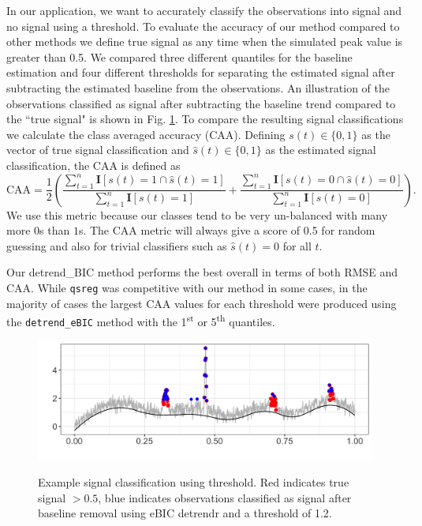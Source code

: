 \documentclass[12pt]{article}
\begin{document}
	In our application, we want to accurately classify the observations into signal and no signal using a threshold. To evaluate the accuracy of our method compared to other methods we define true signal as any time when the simulated peak value is greater than 0.5. We compared three different quantiles for the baseline estimation and four different thresholds for separating the estimated signal after subtracting the estimated baseline from the observations.  An illustration of the observations classified as signal after subtracting the baseline trend compared to the ``true signal" is shown in Fig. \ref{fig:peaks_class_eg}. To compare the resulting signal classifications we calculate the class averaged accuracy (CAA). Defining $s(t) \in \{0,1\}$ as the vector of true signal classification and $\hat{s}(t) \in \{0,1\}$ as the estimated signal classification, the CAA is defined as
	\begin{equation}
	\mbox{CAA} = \frac{1}{2}\left(\frac{\sum_{t=1}^n \mathbf{I}[s(t) = 1 \cap \hat{s}(t)=1]}{\sum_{t=1}^n \mathbf{I}[s(t) = 1]} + \frac{\sum_{t=1}^n \mathbf{I}[s(t) = 0 \cap \hat{s}(t)=0]}{\sum_{t=1}^n \mathbf{I}[s(t) = 0]}\right).
	\end{equation}  
	We use this metric because our classes tend to be very un-balanced with many more $0$s than $1$s. The CAA metric will always give a score of 0.5 for random guessing and also for trivial classifiers such as $\hat{s}(t) = 0$ for all $t$. 

	Our detrend\_BIC method performs the best overall in terms of both RMSE and CAA. While \texttt{qsreg} was competitive with our method in some cases, in the majority of cases the largest CAA values for each threshold were produced using the \texttt{detrend\_eBIC} method with the 1\textsuperscript{st} or 5\textsuperscript{th} quantiles. 
	
	\begin{figure}[h!]
		\caption{Example signal classification using threshold. Red indicates true signal $>0.5$, blue indicates observations classified as signal after baseline removal using eBIC detrendr and a threshold of 1.2.}
		\includegraphics[width = \linewidth]{Figures/peaks_eg_class.png}
		\label{fig:peaks_class_eg}
	\end{figure}
	
\end{document}

